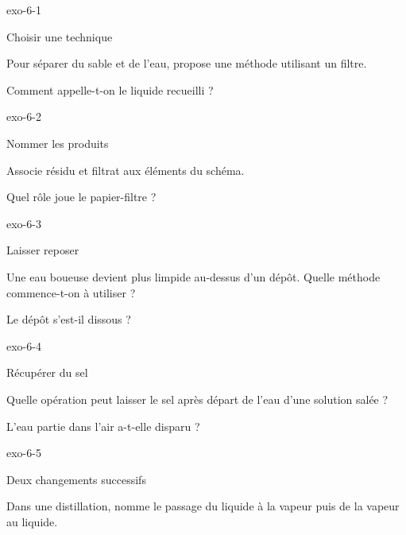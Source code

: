 \documentclass[12pt,twoside,openany]{book}
\begin{document}
\clearpage{}
\begin{blocLivre}{exo-6-1}
\begin{exercice}[1]{Choisir une technique}
\begin{questions}
\item Pour séparer du sable et de l’eau, propose une méthode utilisant un filtre.
\item Comment appelle-t-on le liquide recueilli ?
\end{questions}
\end{exercice}\end{blocLivre}
\begin{blocLivre}{exo-6-2}
\begin{exercice}[1]{Nommer les produits}
\begin{questions}
\item Associe résidu et filtrat aux éléments du schéma.
\item Quel rôle joue le papier-filtre ?
\end{questions}
\end{exercice}\end{blocLivre}
\begin{blocLivre}{exo-6-3}
\begin{exercice}[1]{Laisser reposer}
\begin{questions}
\item Une eau boueuse devient plus limpide au-dessus d’un dépôt. Quelle méthode commence-t-on à utiliser ?
\item Le dépôt s’est-il dissous ?
\end{questions}
\end{exercice}\end{blocLivre}
\begin{blocLivre}{exo-6-4}
\begin{exercice}[1]{Récupérer du sel}
\begin{questions}
\item Quelle opération peut laisser le sel après départ de l’eau d’une solution salée ?
\item L’eau partie dans l’air a-t-elle disparu ?
\end{questions}
\end{exercice}\end{blocLivre}
\begin{blocLivre}{exo-6-5}
\begin{exercice}[1]{Deux changements successifs}
\begin{questions}
\item Dans une distillation, nomme le passage du liquide à la vapeur puis de la vapeur au liquide.
\end{questions}
\end{exercice}\end{blocLivre}
\end{document}

